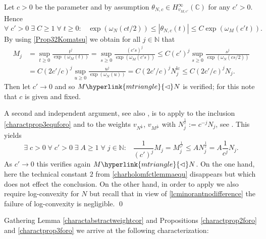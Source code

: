 \documentclass[10pt]{amsart}%
\numberwithin{equation}{section}
\theoremstyle{plain}
\newcommand{\CC}{\mathbb{C}}
\newcommand{\NN}{\mathbb{N}}
\let\on=\operatorname
\begin{document}
Let $c>0$ be the parameter and by assumption $\theta_{N,c}\in H^{\infty}_{v_{M,c'}}(\CC)$ for any $c'>0$. Hence
$$\forall\;c'>0\;\exists\;C\ge 1\;\forall\;t\ge 0:\;\;\;\exp(\omega_N(ct/2))\le|\theta_{N,c}(t)|\le C\exp(\omega_M(c't)).$$
By using \eqref{Prop32Komatsu} we obtain for all $j\in\NN$ that
\begin{align*}
	M_j&=\sup_{t\ge 0}\frac{t^j}{\exp(\omega_{M}(t))}=\sup_{s\ge 0}\frac{(c's)^j}{\exp(\omega_{M}(c's))}\le C(c')^j\sup_{s\ge 0}\frac{s^j}{\exp(\omega_{N}(cs/2))}
	\\&
	=C(2c'/c)^j\sup_{u\ge 0}\frac{u^j}{\exp(\omega_{N}(u))}=C(2c'/c)^jN^{\on{lc}}_j\le C(2c'/c)^jN_j.
\end{align*}
Then let $c'\rightarrow 0$ and so $M\hyperlink{mtriangle}{\vartriangleleft}N$ is verified; for this note that $c$ is given and fixed.\vspace{6pt}

A second and independent argument, see also \cite[Prop. 3.13]{weightedentirecharacterization}, is to apply \cite[Thm. 3.5]{weightedentirecharacterization} to the inclusion \eqref{charactprop3equforo} and to the weights $v_{N^{\frac{1}{c}}}$, $v_{M^{\frac{1}{c'}}}$ with $N^{\frac{1}{c}}_j:=c^{-j}N_j$, see \cite[Rem. 2.10 $(a)$]{weightedentirecharacterization}. This yields
$$\exists\;c>0\;\forall\;c'>0\;\exists\;A\ge 1\;\forall\;j\in\NN:\;\;\;\frac{1}{(c')^j}M_j=M^{\frac{1}{c'}}_j\le AN^{\frac{1}{c}}_j=A\frac{1}{c^j}N_j.$$
As $c'\rightarrow 0$ this verifies again $M\hyperlink{mtriangle}{\vartriangleleft}N$. On the one hand, here the technical constant $2$ from \eqref{charholomfctlemmaequ} disappears but which does not effect the conclusion. On the other hand, in order to apply \cite[Thm. 3.5]{weightedentirecharacterization} we also require log-convexity for $N$ but recall that in view of \eqref{lcminorantnodifference} the failure of log-convexity is negligible.
\qed\enddemo

Gathering Lemma \ref{charactabstractweightcor} and Propositions \ref{charactprop2foro} and \ref{charactprop3foro} we arrive at the following characterization:
\end{document}
